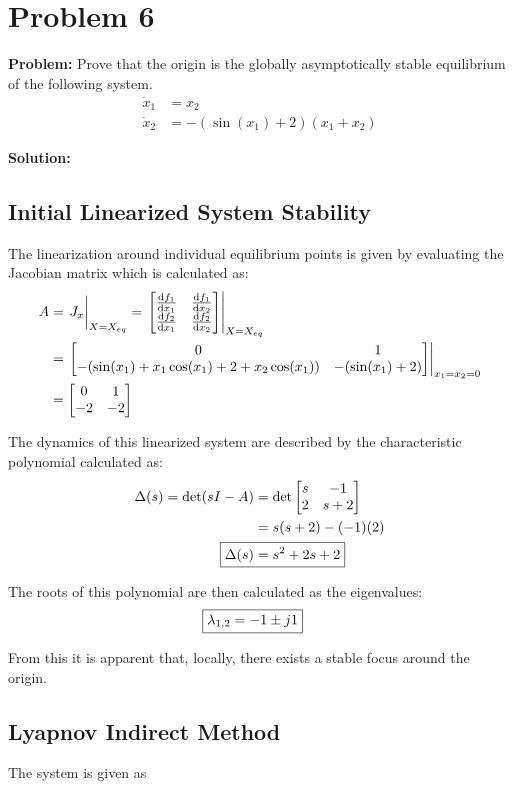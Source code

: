 \documentclass[letter]{article}
\numberwithin{equation}{section}
\begin{document}
\newpage
\section{Problem 6}
\textbf{Problem:}
Prove that the origin is the globally asymptotically stable equilibrium of the following system.
\begin{equation}
	\begin{aligned}
		\dot{x}_1 &= x_2\\
		\dot{x}_2 &= -(\sin(x_1) + 2)(x_1 + x_2)
	\end{aligned}
\end{equation}

\noindent
\textbf{Solution:}
\subsection{Initial Linearized System Stability}
The linearization around individual equilibrium points is given by evaluating the Jacobian matrix which is calculated as:
\begin{align}
	A &= \eval{J_x}_{X = X_{eq}}
	= \eval{\mqty[\dv{f_1}{x_1}&\dv{f_1}{x_2}\\\dv{f_2}{x_1}&\dv{f_2}{x_2}]}_{X=X_{eq}}\\
	&= \eval{\mqty[0 & 1\\
		-(\sin(x_1) + x_1 \cos(x_1) + 2 + x_2 \cos(x_1)) & -(\sin(x_1) + 2)
		]}_{x_1 = x_2 = 0}\\
	&= \mqty[0&1\\-2 &-2]
\end{align}

The dynamics of this linearized system are described by the characteristic polynomial calculated as:
\begin{align}
	\Delta(s) = \det(sI - A)
	&= \det\mqty[s &-1\\ 2 &s+2]\\
	&= s(s+2) - (-1) (2)\\
	\Aboxed{\Delta(s) &= s^2 + 2s + 2}
\end{align}

The roots of this polynomial are then calculated as the eigenvalues:
\begin{align}
	\Aboxed{\lambda_{1,2} &= -1 \pm j 1}
\end{align}

From this it is apparent that, locally, there exists a stable focus around the origin.

\newpage
\subsection{Lyapnov Indirect Method}
The system is given as 
\end{document}
